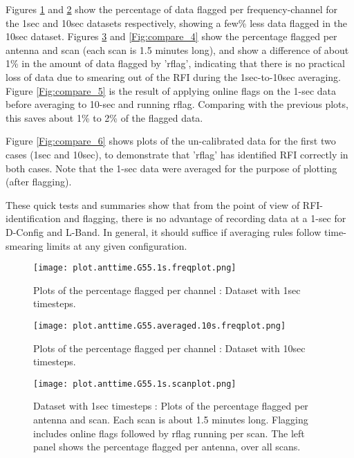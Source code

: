 
Figures \ref{Fig:compare_1} and \ref{Fig:compare_2} show the percentage of data flagged per frequency-channel for the 1sec and 10sec datasets respectively, showing a few\% less data flagged in the 10sec dataset.  Figures \ref{Fig:compare_3} and \ref{Fig:compare_4} show the percentage flagged per antenna and scan (each scan is 1.5 minutes long), and show a difference of about 1\% in the amount of data flagged by 'rflag', indicating that there is no practical loss of data due to smearing out of the RFI during the 1sec-to-10sec averaging. 
Figure  \ref{Fig:compare_5} is the result of applying online flags on the 1-sec data before averaging to 10-sec and running rflag. Comparing with the previous plots, this saves about 1\% to 2\% of the flagged data. 

Figure  \ref{Fig:compare_6} shows plots of the un-calibrated data for the first two cases (1sec and 10sec), to demonstrate that 'rflag' has identified RFI correctly in both cases. Note that the 1-sec data were averaged for the purpose of plotting (after flagging).

These quick tests and summaries show that from the point of view of RFI-identification and flagging, there is no advantage of recording data at a 1-sec for D-Config and L-Band. In general, it should suffice if averaging rules follow time-smearing limits at any given configuration.

\begin{figure}
\texttt{[image: plot.anttime.G55.1s.freqplot.png]}
\caption{Plots of the percentage flagged per channel :  Dataset with 1sec timesteps.}
\label{Fig:compare_1}
\end{figure}

\begin{figure}
\texttt{[image: plot.anttime.G55.averaged.10s.freqplot.png]}
\caption{Plots of the percentage flagged per channel : Dataset with 10sec timesteps.}
\label{Fig:compare_2}
\end{figure}

\begin{figure}
\texttt{[image: plot.anttime.G55.1s.scanplot.png]}
\caption{Dataset with 1sec timesteps : Plots of the percentage flagged per antenna and scan. Each scan is about 1.5 minutes long. Flagging includes online flags followed by rflag running per scan. The left panel shows the percentage flagged per antenna, over all scans.}
\label{Fig:compare_3}
\end{figure}

